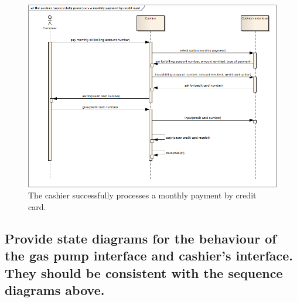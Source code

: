 \documentclass[11pt,a4paper]{article}
\begin{document}
\begin{figure}[H]
 \centering
 \includegraphics[width=\textwidth]{../sequence3.png} 
 \caption{The cashier successfully processes a monthly payment by credit card.}
 \label{fig:sequence3}
\end{figure}


\subsection*{Provide state diagrams for the behaviour of the gas pump interface and cashier’s interface. They should be consistent with the sequence diagrams above.}
\end{document}
